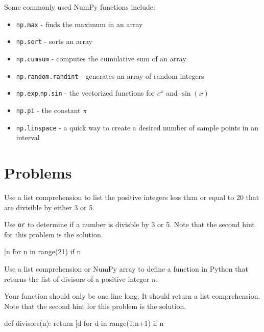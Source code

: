 \documentclass{ximera}
\begin{document}
Some commonly used NumPy functions include:

\begin{itemize}
	\item \verb|np.max| - finds the maximum in an array
	\item \verb|np.sort| - sorts an array
	\item \verb|np.cumsum| - computes the cumulative sum of an array
	\item \verb|np.random.randint| - generates an array of random integers
	\item \verb|np.exp|,\verb|np.sin| - the vectorized functions for $e^x$ and $\sin(x)$
	\item \verb|np.pi| - the constant $\pi$
	\item \verb|np.linspace| - a quick way to create a desired number of sample points in an interval
\end{itemize}

\section{Problems}

\begin{question}
Use a list comprehension to list the positive integers less than or equal to 20 that are divisible by either 3 or 5.
	\begin{hint}
	Use \verb|or| to determine if a number is divisble by 3 or 5. Note that the second hint for this problem is the solution.
	\end{hint}
	\begin{hint}
\begin{sageCell}
	[n for n in range(21) if n%
\end{sageCell}
	\end{hint}
\end{question}

\begin{question}
Use a list comprehension or NumPy array to define a function in Python that returns the list of divisors of a positive integer $n$.
	\begin{hint}
	Your function should only be one line long. It should return a list comprehension. Note that the second hint for this problem is the solution.
	\end{hint}
	\begin{hint}
\begin{sageCell}
def divisors(n):
        return [d for d in range(1,n+1) if n%
\end{sageCell}
	\end{hint}
\end{question}
\end{document}
